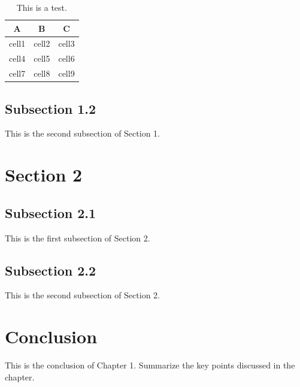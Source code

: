 \documentclass[11pt]{article}
\begin{document}
\begin{table}[h]
\begin{center}
\caption{This is a test.}
\begin{tabular}{ c c c }
\hline
A & B & C \\
\hline
 cell1 & cell2 & cell3 \\
 cell4 & cell5 & cell6 \\
 cell7 & cell8 & cell9
\hline
\end{tabular}
\end{center}
\end{table}

\subsection{Subsection 1.2}
This is the second subsection of Section 1.

\section{Section 2}
\subsection{Subsection 2.1}
This is the first subsection of Section 2.

\subsection{Subsection 2.2}
This is the second subsection of Section 2.

\section{Conclusion}
This is the conclusion of Chapter 1. Summarize the key points discussed in the chapter.
\end{document}
